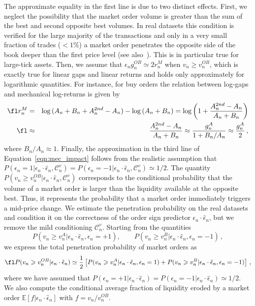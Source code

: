 \documentclass[12pt]{iopart}
\begin{document}
The approximate equality in the first line is due to two distinct effects. First, we neglect the possibility that the market order volume is greater than the sum of the best and second opposite best volumes. In real datasets this condition is verified for the large majority of the transactions and only in a very small fraction of trades ($<1\%$) a market order penetrates the opposite side of the book deeper than the first price level (see also~\cite{farmer2004really}). This is in particular true for large-tick assets. Then, we assume that $\epsilon_n g_n^{OB} \simeq 2r_n^M$ when $v_n \geqslant v_n^{OB}$, which is exactly true for linear gaps and linear returns and holds only approximately for logarithmic quantities. For instance, for buy orders the relation between log-gaps and mechanical log-returns is given by 
\begin{eqnarray*}
\fl r_n^M &=& \log{(A_n+B_n+A_n^{2nd}-A_n)}-\log{(A_n+B_n)}=\log{\left(1+\frac{A_n^{2nd}-A_n}{A_n+B_n}\right)} \nonumber \\
\fl & \approx & \frac{A_n^{2nd}-A_n}{A_n+B_n} \approx \frac{g_n^A}{1+B_n/A_n}\approx\frac{g_n^A}{2}\,,
\end{eqnarray*}
where $B_n/A_n \approx 1$. Finally, the approximation in the third line of Equation~\ref{eqn:mec_impact} follows from the realistic assumption that $P(\epsilon_n=1|\epsilon_n\cdot\hat{\epsilon}_n,\mathcal{C}_n^v)=P(\epsilon_n=-1|\epsilon_n\cdot\hat{\epsilon}_n,\mathcal{C}_n^v)\simeq 1/2$. The quantity $P(v_n \geqslant v_n^{OB}|\epsilon_n\cdot\hat{\epsilon}_n,\mathcal{C}_n^v)$ corresponds to the conditional probability that the volume of a market order is larger than the liquidity available at the opposite best. Thus, it represents the probability that a market order immediately triggers a mid-price change. We estimate the penetration probability on the real datasets and condition it on the correctness of the order sign predictor $\epsilon_n\cdot\hat{\epsilon}_n$, but we remove the mild conditioning $\mathcal{C}_n^v$. Starting from the quantities 
\begin{equation*}
  P(v_n \geqslant v_n^A|\epsilon_n\cdot\hat{\epsilon}_n,\epsilon_n=+1), \qquad P(v_n \geqslant v_n^B|\epsilon_n\cdot\hat{\epsilon}_n,\epsilon_n=-1)\,,
\end{equation*}
we express the total penetration probability of market orders as
\begin{equation*}
\fl  P(v_n \geqslant v_n^{OB}|\epsilon_n\cdot\hat{\epsilon}_n)\simeq \frac{1}{2}\left[P(v_n \geqslant v_n^A|\epsilon_n\cdot\hat{\epsilon}_n,\epsilon_n=1)+P(v_n \geqslant v_n^B|\epsilon_n\cdot\hat{\epsilon}_n,\epsilon_n=-1)\right] \,,
\end{equation*}
where we have assumed that $P(\epsilon_n=+1|\epsilon_n\cdot\hat{\epsilon}_n) = P(\epsilon_n=-1|\epsilon_n\cdot\hat{\epsilon}_n) \simeq 1/2$. We also compute the conditional average fraction of liquidity eroded by a market order $\mathbb{E}[f|\epsilon_n\cdot\hat{\epsilon}_n]$ with $f=v_n/v_n^{OB}$.
\end{document}
